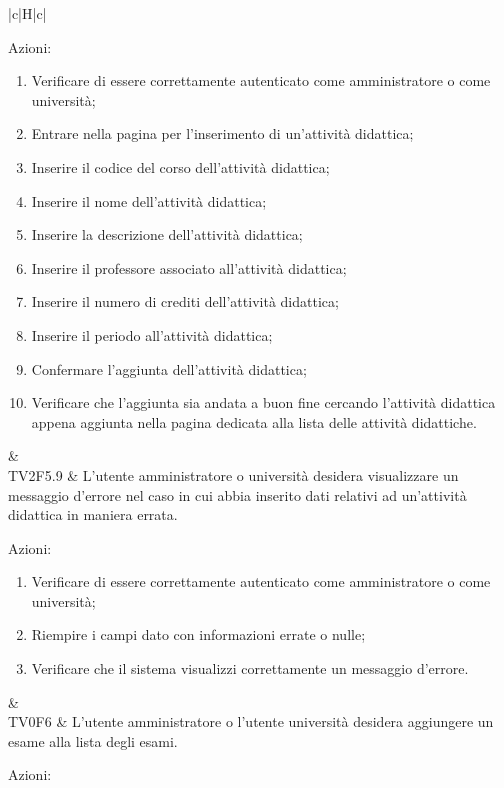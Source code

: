 \begin{longtable}{|c|H|c|}
\begin{flushleft}
		Azioni:\newline
		\end{flushleft} 
		\begin{enumerate}
			\item Verificare di essere correttamente autenticato come amministratore o come università;
			\item Entrare nella pagina per l'inserimento di un'attività didattica;
			\item Inserire il codice del corso dell'attività didattica;
			\item Inserire il nome dell'attività didattica;
			\item Inserire la descrizione dell'attività didattica;
			\item Inserire il professore associato all'attività didattica;
			\item Inserire il numero di crediti dell'attività didattica;
			\item Inserire il periodo all'attività didattica;
			\item Confermare l'aggiunta dell'attività didattica;
			\item Verificare che l'aggiunta sia andata a buon fine cercando l'attività didattica appena aggiunta nella pagina dedicata alla lista delle attività didattiche.
		\end{enumerate} & \Tni \\
	\hline
	TV2F5.9 &  L'utente amministratore o università desidera visualizzare un messaggio d'errore nel caso in cui abbia inserito dati relativi ad un'attività didattica in maniera errata. \newline \begin{flushleft}
		Azioni:\newline
	\end{flushleft} 
	\begin{enumerate}
		\item Verificare di essere correttamente autenticato come amministratore o come università;
		\item Riempire i campi dato con informazioni errate o nulle;
		\item Verificare che il sistema visualizzi correttamente un messaggio d'errore.
	\end{enumerate}  & \Tni \\
	\hline
	TV0F6 & L'utente amministratore o l'utente università desidera aggiungere un esame alla lista degli esami. \newline \begin{flushleft}
		Azioni:\newline

\end{flushleft}
\end{longtable}
